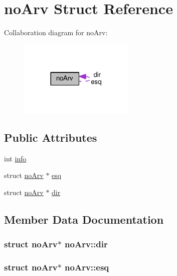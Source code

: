 \hypertarget{structnoArv}{}\section{no\+Arv Struct Reference}
\label{structnoArv}


Collaboration diagram for no\+Arv\+:
\nopagebreak
\begin{figure}[H]
\begin{center}
\leavevmode
\includegraphics[width=156pt]{structnoArv__coll__graph}
\end{center}
\end{figure}
\subsection*{Public Attributes}
\begin{DoxyCompactItemize}
\item 
int \hyperlink{structnoArv_a024fbe9c9e750cab832562b09d49200e}{info}
\item 
struct \hyperlink{structnoArv}{no\+Arv} $\ast$ \hyperlink{structnoArv_a0c0b5ff0d841e3d90215a04185f0899d}{esq}
\item 
struct \hyperlink{structnoArv}{no\+Arv} $\ast$ \hyperlink{structnoArv_abe103e6775ec6bb1d39b61f54c4cf32c}{dir}
\end{DoxyCompactItemize}


\subsection{Member Data Documentation}
\subsubsection[{\texorpdfstring{dir}{dir}}]{\setlength{\rightskip}{0pt plus 5cm}struct {\bf no\+Arv}$\ast$ no\+Arv\+::dir}\hypertarget{structnoArv_abe103e6775ec6bb1d39b61f54c4cf32c}{}\label{structnoArv_abe103e6775ec6bb1d39b61f54c4cf32c}
\subsubsection[{\texorpdfstring{esq}{esq}}]{\setlength{\rightskip}{0pt plus 5cm}struct {\bf no\+Arv}$\ast$ no\+Arv\+::esq}\hypertarget{structnoArv_a0c0b5ff0d841e3d90215a04185f0899d}{}\label{structnoArv_a0c0b5ff0d841e3d90215a04185f0899d}
